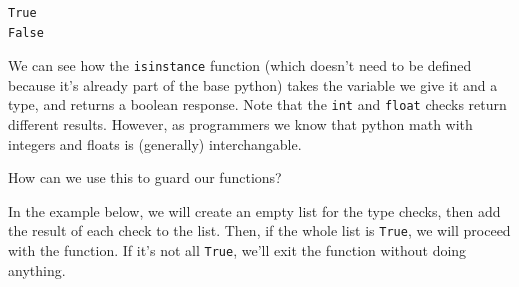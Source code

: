     \begin{Verbatim}[commandchars=\\\{\}]
True
False
    \end{Verbatim}

    We can see how the \texttt{isinstance} function (which doesn't need to
be defined because it's already part of the base python) takes the
variable we give it and a type, and returns a boolean response. Note
that the \texttt{int} and \texttt{float} checks return different
results. However, as programmers we know that python math with integers
and floats is (generally) interchangable.

How can we use this to guard our functions?

In the example below, we will create an empty list for the type checks,
then add the result of each check to the list. Then, if the whole list
is \texttt{True}, we will proceed with the function. If it's not all
\texttt{True}, we'll exit the function without doing anything.

